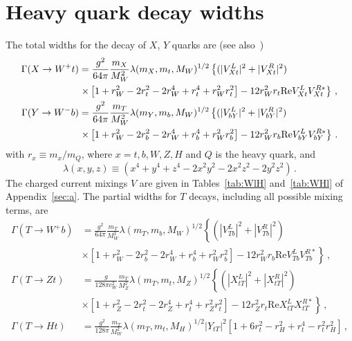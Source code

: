 \documentclass[12pt,a4paper]{article}
\newcommand{\RE}{\text{Re}}
\begin{document}
\section{Heavy quark decay widths}
\label{sec:b}

The total widths for the decay of $X$, $Y$ quarks are (see also~\cite{Atre:2011ae})
\begin{align}
\Gamma(X \to W^+ t) & = \frac{g^2}{64 \pi}  \frac{m_X}{M_W^2} \lambda(m_X,m_t,M_W)^{1/2} \left\{
(|V_{Xt}^L|^2+|V_{Xt}^R|^2)  \right. \nonumber \\
  & \left. \times \left[ 1+r_W^2-2 r_t^2
  -2 r_W^4  + r_t^4 +r_W^2 r_t^2
  \right]  -12 r_W^2 r_t \RE V_{Xt}^L V_{Xt}^{R*} \right\} \,, \notag \\
\Gamma(Y \to W^- b) & = \frac{g^2}{64 \pi}  \frac{m_T}{M_W^2} \lambda(m_Y,m_b,M_W)^{1/2} \left\{
(|V_{bY}^L|^2+|V_{bY}^R|^2)  \right. \nonumber \\
  & \left. \times \left[ 1+r_W^2-2 r_b^2
  -2 r_W^4  + r_b^4 +r_W^2 r_b^2
  \right]  -12 r_W^2 r_b \RE V_{bY}^L V_{bY}^{R*} \right\}
\,.
\label{ec:GammaXY}
\end{align}
with $r_x \equiv m_x / m_Q$, where $x=t,b,W,Z,H$ and $Q$ is the heavy quark, and
\begin{equation}
\lambda(x,y,z) \equiv (x^4 + y^4 + z^4 - 2 x^2 y^2 
- 2 x^2 z^2 - 2 y^2 z^2) \,.
\end{equation}%
The charged current mixings $V$ are given in Tables~\ref{tab:WlH} and~\ref{tab:WHl} of Appendix~\ref{sec:a}.
The partial widths for $T$ decays, including all possible mixing terms, are
\begin{align}
\Gamma(T \to W^+ b) & = \frac{g^2}{64 \pi}  \frac{m_T}{M_W^2} \lambda(m_T,m_b,M_W)^{1/2} \left\{
(|V_{Tb}^L|^2+|V_{Tb}^R|^2)  \right. \nonumber \\
  & \left. \times \left[ 1+r_W^2-2 r_b^2 -2 r_W^4  + r_b^4 +r_W^2 r_b^2
  \right]  -12 r_W^2 r_b \RE V_{Tb}^L V_{Tb}^{R*} \right\}
\,, \nonumber \\
%
\Gamma(T \to Z t) & = \frac{g}{128 \pi c_W^2}  \frac{m_T}{M_Z^2} \lambda(m_T,m_t,M_Z)^{1/2}
\left\{ (|X_{tT}^L|^2 + |X_{tT}^R|^2) \right. \nonumber \\
  & \left. \times  \left[ 1 + r_Z^2 - 2  r_t^2 - 2  r_Z^4  + r_t^4
  + r_Z^2 r_t^2 \right]  -12 r_Z^2 r_t \RE X_{tT}^L X_{tT}^{R*}  \right\} \,, \nonumber \\
\Gamma(T \to H t) & = \frac{g^2}{128 \pi}
 \frac{m_T}{M_W^2} \lambda(m_T,m_t,M_H)^{1/2} |Y_{tT}|^2 \left[ 1 + 6 r_t^2 - r_H^2 
  + r_t^4 - r_t^2 r_H^2 \right] \,,
\label{ec:GammaT}
\end{align}
\end{document}
